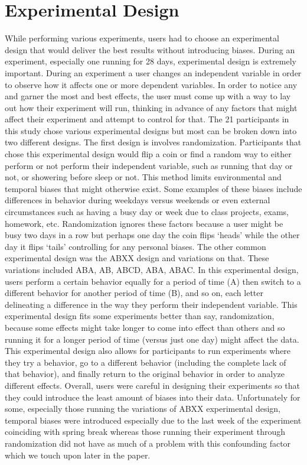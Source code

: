 \section{Experimental Design}

While performing various experiments, users had to choose an experimental design that would deliver the best results without introducing biases. During an experiment, especially one running for 28 days, experimental design is extremely important. During an experiment a user changes an independent variable in order to observe how it affects one or more dependent variables. In order to notice any and garner the most and best effects, the user must come up with a way to lay out how their experiment will run, thinking in advance of any factors that might affect their experiment and attempt to control for that. The 21 participants in this study chose various experimental designs but most can be broken down into two different designs. 
    The first design is involves randomization. Participants that chose this experimental design would flip a coin or find a random way to either perform or not perform their independent variable, such as running that day or not, or showering before sleep or not. This method limits environmental and temporal biases that might otherwise exist. Some examples of these biases include differences in behavior during weekdays versus weekends or even external circumstances such as having a busy day or week due to class projects, exams, homework, etc. Randomization ignores these factors because a user might be busy two days in a row but perhaps one day the coin flips ‘heads’ while the other day it flips ‘tails’ controlling for any personal biases. 
    The other common experimental design was the ABXX design and variations on that. These variations included ABA, AB, ABCD, ABA, ABAC. In this experimental design, users perform a certain behavior equally for a period of time (A) then switch to a different behavior for another period of time (B), and so on, each letter delineating a difference in the way they perform their independent variable. This experimental design fits some experiments better than say, randomization, because some effects might take longer to come into effect than others and so running it for a longer period of time (versus just one day) might affect the data. This experimental design also allows for participants to run experiments where they try a behavior, go to a different behavior (including the complete lack of that behavior), and finally return to the original behavior in order to analyze different effects. 
    Overall, users were careful in designing their experiments so that they could introduce the least amount of biases into their data. Unfortunately for some, especially those running the variations of ABXX experimental design, temporal biases were introduced especially due to the last week of the experiment coinciding with spring break whereas those running their experiment through randomization did not have as much of a problem with this confounding factor which we touch upon later in the paper. 
